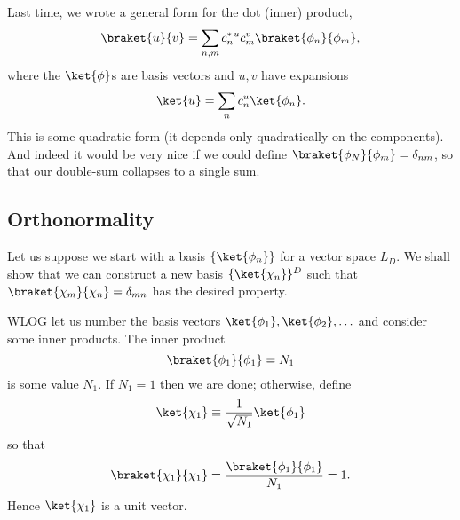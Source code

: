 Last time, we wrote a general form for the dot (inner) product,
\begin{equation}
    \braket{u}{v} = \sum_{n,m} c_n^*{}^u c_m^v \braket{\phi_n}{\phi_m},
\end{equation}
where the $\ket{\phi}$s are basis vectors and $u,v$ have expansions
\begin{equation}
    \ket{u} = \sum_n c_n^u \ket{\phi_n}.
\end{equation}
This is some quadratic form (it depends only quadratically on the components). And indeed it would be very nice if we could define $\braket{\phi_N}{\phi_m}=\delta_{nm}$, so that our double-sum collapses to a single sum.

\subsection*{Orthonormality}
Let us suppose we start with a basis $\set{\ket{\phi_n}}$ for a vector space $L_D$. We shall show that we can construct a new basis $\set{\ket{\chi_n}}^D$ such that $\braket{\chi_m}{\chi_n}=\delta_{mn}$ has the desired property.

WLOG let us number the basis vectors $\ket{\phi_1},\ket{\phi_2},\ldots$ and consider some inner products. The inner product
\begin{equation}
    \braket{\phi_1}{\phi_1}=N_1
\end{equation}
is some value $N_1$. If $N_1=1$ then we are done; otherwise, define
\begin{equation}
    \ket{\chi_1}\equiv \frac{1}{\sqrt{N_1}}\ket{\phi_1}
\end{equation}
so that
\begin{equation}
    \braket{\chi_1}{\chi_1} = \frac{\braket{\phi_1}{\phi_1}}{N_1}=1.
\end{equation}
Hence $\ket{\chi_1}$ is a unit vector.

